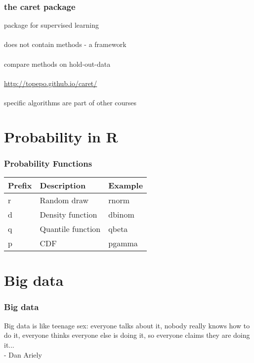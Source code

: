 \documentclass{beamer}
\begin{document}
\begin{frame}
	\frametitle{the caret package}
	\begin{center}
		package for supervised learning\\~\\
		does not contain methods - a framework\\~\\
		compare methods on hold-out-data\\~\\
		\href{http://topepo.github.io/caret/}{http://topepo.github.io/caret/}\\~\\
		specific algorithms are part of other courses
	\end{center}
\end{frame}

\section{Probability in R}

\begin{frame}
	\frametitle{Probability Functions}
	\begin{center}
	\begin{table}
		\begin{tabular}{l | l | l}
			\textbf{Prefix} & \textbf{Description} & \textbf{Example}\\
			\hline
			r & Random draw & rnorm \\
			\hline
			d & Density function & dbinom \\
			\hline
			q & Quantile function & qbeta \\
			\hline
			p & CDF & pgamma \\
		\end{tabular}
	\end{table}
\end{center}
\end{frame}

\section{Big data}

\begin{frame}
	\frametitle{Big data}
	Big data is like teenage sex:
	everyone talks about it,
	nobody really knows how to do it,
	everyone thinks everyone else is doing it,
	so everyone claims they are doing it...\\
	- Dan Ariely
\end{frame}
\end{document}
